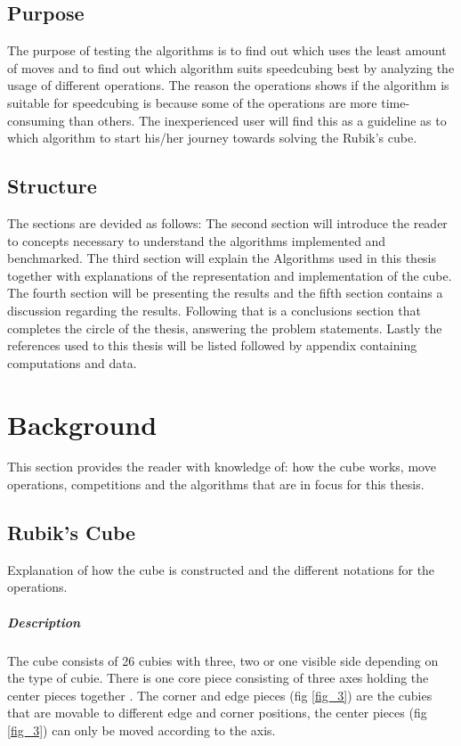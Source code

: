 \documentclass[a4paper,11pt]{kth-mag}
\begin{document}
\section{Purpose}
The purpose of testing the algorithms is to find out which uses the least amount of moves and to find out which algorithm suits speedcubing best by analyzing the usage of different operations. The reason the operations shows if the algorithm is suitable for speedcubing is because some of the operations are more time-consuming than others. The inexperienced user will find this as a guideline as to which algorithm to start his/her journey towards solving the Rubik’s cube.
\section{Structure}
The sections are devided as follows: The second section will introduce the reader to concepts necessary to understand the algorithms implemented and benchmarked. The third section will explain the Algorithms used in this thesis together with explanations of the representation and implementation of the cube. The fourth section will be presenting the results and the fifth section contains a discussion regarding the results. Following that is a conclusions section that completes the circle of the thesis, answering the problem statements. Lastly the references used to this thesis will be listed followed by appendix containing computations and data.  


\chapter{Background}
This section provides the reader with knowledge of: how the cube works, move operations, competitions and the algorithms that are in focus for this thesis.
\section{Rubik's Cube}
Explanation of how the cube is constructed and the different notations for the operations.
\paragraph{Description}
The cube consists of 26 cubies with three, two or one visible side depending on the type of cubie. There is one core piece consisting of three axes holding the center pieces together \cite{MadeHow}. 
  The corner and edge pieces (fig \ref{fig_3})  are the cubies that are movable to different edge and corner positions, the center pieces (fig \ref{fig_3}) can only be moved according to the axis.  
\end{document}
